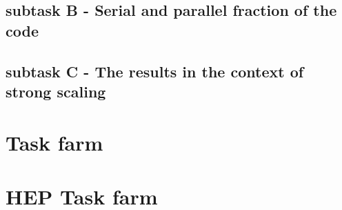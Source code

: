 \documentclass{article}
\begin{document}
\subsection{subtask B - Serial and parallel fraction of the code}


\subsection{subtask C - The results in the context of strong scaling}


\section{Task farm}
\label{sec: task farm source}


\section{HEP Task farm}
\label{sec: task farm hep source}

\end{document}
